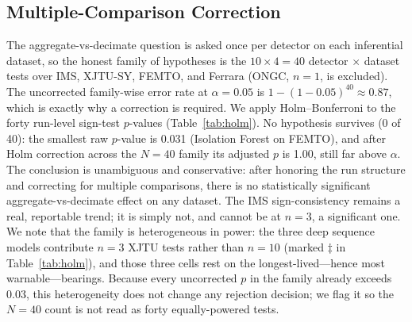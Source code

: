 \documentclass[IJPHM, 2026, 0]{PHMSociety}
\begin{document}
\subsection{Multiple-Comparison Correction}
The aggregate-vs-decimate question is asked once per detector on each inferential dataset, so the honest family of hypotheses is the $10 \times 4 = 40$ detector $\times$ dataset tests over IMS, XJTU-SY, FEMTO, and Ferrara (ONGC, $n=1$, is excluded). The uncorrected family-wise error rate at $\alpha=0.05$ is $1 - (1-0.05)^{40} \approx 0.87$, which is exactly why a correction is required. We apply Holm--Bonferroni to the forty run-level sign-test $p$-values (Table~\ref{tab:holm}). No hypothesis survives (0 of 40): the smallest raw $p$-value is 0.031 (Isolation Forest on FEMTO), and after Holm correction across the $N=40$ family its adjusted $p$ is 1.00, still far above $\alpha$. The conclusion is unambiguous and conservative: after honoring the run structure and correcting for multiple comparisons, there is no statistically significant aggregate-vs-decimate effect on any dataset. The IMS sign-consistency remains a real, reportable trend; it is simply not, and cannot be at $n=3$, a significant one. We note that the family is heterogeneous in power: the three deep sequence models contribute $n=3$ XJTU tests rather than $n=10$ (marked $\ddagger$ in Table~\ref{tab:holm}), and those three cells rest on the longest-lived---hence most warnable---bearings. Because every uncorrected $p$ in the family already exceeds 0.03, this heterogeneity does not change any rejection decision; we flag it so the $N=40$ count is not read as forty equally-powered tests.
\end{document}
